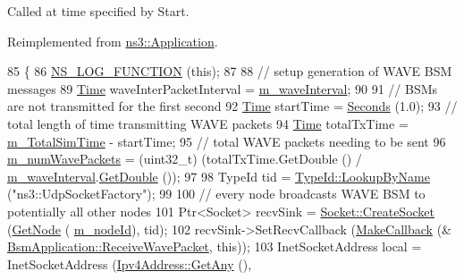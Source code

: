 Called at time specified by Start. 



Reimplemented from \hyperlink{classns3_1_1Application_a3405dd01508beacce8ed6e3a20bdf05a}{ns3\+::\+Application}.


\begin{DoxyCode}
85 \{
86   \hyperlink{log-macros-disabled_8h_a90b90d5bad1f39cb1b64923ea94c0761}{NS\_LOG\_FUNCTION} (\textcolor{keyword}{this});
87 
88   \textcolor{comment}{// setup generation of WAVE BSM messages}
89   \hyperlink{namespacens3_1_1TracedValueCallback_a7ffd3e7c142ffe7c8a1d2db9b8de38ec}{Time} waveInterPacketInterval = \hyperlink{classns3_1_1BsmApplication_a99c61fbd55f10fd1e1e349739fadb178}{m\_waveInterval};
90 
91   \textcolor{comment}{// BSMs are not transmitted for the first second}
92   \hyperlink{namespacens3_1_1TracedValueCallback_a7ffd3e7c142ffe7c8a1d2db9b8de38ec}{Time} startTime = \hyperlink{group__timecivil_ga33c34b816f8ff6628e33d5c8e9713b9e}{Seconds} (1.0);
93   \textcolor{comment}{// total length of time transmitting WAVE packets}
94   \hyperlink{namespacens3_1_1TracedValueCallback_a7ffd3e7c142ffe7c8a1d2db9b8de38ec}{Time} totalTxTime = \hyperlink{classns3_1_1BsmApplication_a0f53d0889462a50b4982657ca6db083d}{m\_TotalSimTime} - startTime;
95   \textcolor{comment}{// total WAVE packets needing to be sent}
96   \hyperlink{classns3_1_1BsmApplication_a35b423a2b33caa0f5455450e6775bde4}{m\_numWavePackets} = (uint32\_t) (totalTxTime.GetDouble () / 
      \hyperlink{classns3_1_1BsmApplication_a99c61fbd55f10fd1e1e349739fadb178}{m\_waveInterval}.\hyperlink{classns3_1_1Time_a303bcdd30438760a958b4eee799c83e8}{GetDouble} ());
97 
98   TypeId tid = \hyperlink{classns3_1_1TypeId_a119cf99c20931fdc294602cd360b180e}{TypeId::LookupByName} (\textcolor{stringliteral}{"ns3::UdpSocketFactory"});
99 
100   \textcolor{comment}{// every node broadcasts WAVE BSM to potentially all other nodes}
101   Ptr<Socket> recvSink = \hyperlink{classns3_1_1Socket_ad448a62bb50ad3dbac59c879a885a8d2}{Socket::CreateSocket} (\hyperlink{classns3_1_1Application_a664b15088389bec8e35b35742138f097}{GetNode} (
      \hyperlink{classns3_1_1BsmApplication_aa94eecd18ffb201c13f58329781b77b6}{m\_nodeId}), tid);
102   recvSink->SetRecvCallback (\hyperlink{group__makecallbackmemptr_ga9376283685aa99d204048d6a4b7610a4}{MakeCallback} (&
      \hyperlink{classns3_1_1BsmApplication_a554561257f6be190892532b80e7eeb81}{BsmApplication::ReceiveWavePacket}, \textcolor{keyword}{this}));
103   InetSocketAddress local = InetSocketAddress (\hyperlink{classns3_1_1Ipv4Address_a7a39b330c8e701183a411d5779fca1a4}{Ipv4Address::GetAny} (), 

\end{DoxyCode}
